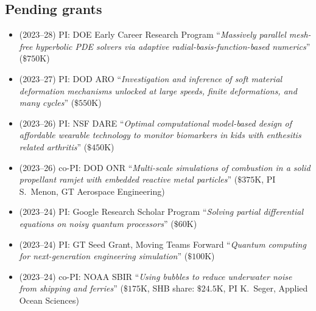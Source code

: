 \subsection{Pending grants}

\begin{itemize}
    \item (2023--28) PI: DOE Early Career Research Program ``\textit{Massively parallel mesh-free hyperbolic PDE solvers via adaptive radial-basis-function-based numerics}'' ($\$750$K)
    \item (2023--27) PI: DOD ARO ``\textit{Investigation and inference of soft material deformation mechanisms unlocked at large speeds, finite deformations, and many cycles}'' ($\$550$K)
    \item (2023--26) PI: NSF DARE ``\textit{Optimal computational model-based design of affordable wearable technology to monitor biomarkers in kids with enthesitis related arthritis}'' ($\$450$K)
    \item (2023--26) co-PI: DOD ONR ``\textit{Multi-scale simulations of combustion in a solid propellant ramjet with embedded reactive metal particles}'' ($\$375$K, PI S.\ Menon, GT Aerospace Engineering)
    \item (2023--24) PI: Google Research Scholar Program ``\textit{Solving partial differential equations on noisy quantum processors}'' ($\$60$K)
    \item (2023--24) PI: GT Seed Grant, Moving Teams Forward ``\textit{Quantum computing for next-generation engineering simulation}'' ($\$100$K)
    \item (2023--24) co-PI: NOAA SBIR ``\textit{Using bubbles to reduce underwater noise from shipping and ferries}'' ($\$175$K, SHB share: $\$24.5$K, PI K.\ Seger, Applied Ocean Sciences)
\end{itemize}
